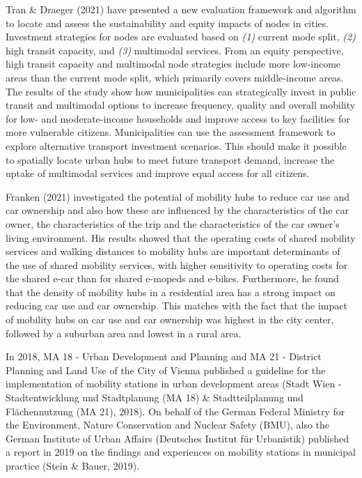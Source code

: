 \documentclass[
]{book}
\begin{document}
Tran \& Draeger (2021) have presented a new evaluation framework and algorithm to locate and assess the sustainability and equity impacts of nodes in cities. Investment strategies for nodes are evaluated based on \emph{(1)} current mode split, \emph{(2)} high transit capacity, and \emph{(3)} multimodal services. From an equity perspective, high transit capacity and multimodal node strategies include more low-income areas than the current mode split, which primarily covers middle-income areas. The results of the study show how municipalities can strategically invest in public transit and multimodal options to increase frequency, quality and overall mobility for low- and moderate-income households and improve access to key facilities for more vulnerable citizens. Municipalities can use the assessment framework to explore alternative transport investment scenarios. This should make it possible to spatially locate urban hubs to meet future transport demand, increase the uptake of multimodal services and improve equal access for all citizens.

Franken (2021) investigated the potential of mobility hubs to reduce car use and car ownership and also how these are influenced by the characteristics of the car owner, the characteristics of the trip and the characteristics of the car owner's living environment. His results showed that the operating costs of shared mobility services and walking distances to mobility hubs are important determinants of the use of shared mobility services, with higher sensitivity to operating costs for the shared e-car than for shared e-mopeds and e-bikes. Furthermore, he found that the density of mobility hubs in a residential area has a strong impact on reducing car use and car ownership. This matches with the fact that the impact of mobility hubs on car use and car ownership was highest in the city center, followed by a suburban area and lowest in a rural area.

In 2018, MA 18 - Urban Development and Planning and MA 21 - District Planning and Land Use of the City of Vienna published a guideline for the implementation of mobility stations in urban development areas (Stadt Wien - Stadtentwicklung und Stadtplanung (MA 18) \& Stadtteilplanung und Flächennutzung (MA 21), 2018). On behalf of the German Federal Ministry for the Environment, Nature Conservation and Nuclear Safety (BMU), also the German Institute of Urban Affairs (Deutsches Institut für Urbanistik) published a report in 2019 on the findings and experiences on mobility stations in municipal practice (Stein \& Bauer, 2019).
\end{document}
